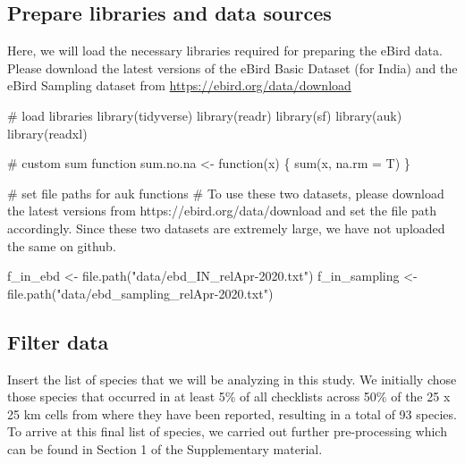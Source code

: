 \documentclass[]{article}
\newenvironment{Shaded}{}{}
\newcommand{\CommentTok}[1]{\textcolor[rgb]{0.00,0.50,0.00}{#1}}
\newcommand{\ControlFlowTok}[1]{\textcolor[rgb]{0.00,0.00,1.00}{#1}}
\newcommand{\DataTypeTok}[1]{#1}
\newcommand{\KeywordTok}[1]{\textcolor[rgb]{0.00,0.00,1.00}{#1}}
\newcommand{\NormalTok}[1]{#1}
\newcommand{\StringTok}[1]{\textcolor[rgb]{0.00,0.50,0.50}{#1}}
\begin{document}
\hypertarget{prepare-libraries-and-data-sources}{%
\subsection{Prepare libraries and data sources}\label{prepare-libraries-and-data-sources}}

Here, we will load the necessary libraries required for preparing the eBird data. Please download the latest versions of the eBird Basic Dataset (for India) and the eBird Sampling dataset from \url{https://ebird.org/data/download}

\begin{Shaded}
\begin{Highlighting}[numbers=left,,]
\CommentTok{# load libraries}
\KeywordTok{library}\NormalTok{(tidyverse)}
\KeywordTok{library}\NormalTok{(readr)}
\KeywordTok{library}\NormalTok{(sf)}
\KeywordTok{library}\NormalTok{(auk)}
\KeywordTok{library}\NormalTok{(readxl)}

\CommentTok{# custom sum function}
\NormalTok{sum.no.na <-}\StringTok{ }\ControlFlowTok{function}\NormalTok{(x) \{}
  \KeywordTok{sum}\NormalTok{(x, }\DataTypeTok{na.rm =}\NormalTok{ T)}
\NormalTok{\}}

\CommentTok{# set file paths for auk functions}
\CommentTok{# To use these two datasets, please download the latest versions from https://ebird.org/data/download and set the file path accordingly. Since these two datasets are extremely large, we have not uploaded the same on github. }

\NormalTok{f_in_ebd <-}\StringTok{ }\KeywordTok{file.path}\NormalTok{(}\StringTok{"data/ebd_IN_relApr-2020.txt"}\NormalTok{)}
\NormalTok{f_in_sampling <-}\StringTok{ }\KeywordTok{file.path}\NormalTok{(}\StringTok{"data/ebd_sampling_relApr-2020.txt"}\NormalTok{)}
\end{Highlighting}
\end{Shaded}

\hypertarget{filter-data}{%
\subsection{Filter data}\label{filter-data}}

Insert the list of species that we will be analyzing in this study. We initially chose those species that occurred in at least 5\% of all checklists across 50\% of the 25 x 25 km cells from where they have been reported, resulting in a total of 93 species. To arrive at this final list of species, we carried out further pre-processing which can be found in Section 1 of the Supplementary material.
\end{document}
